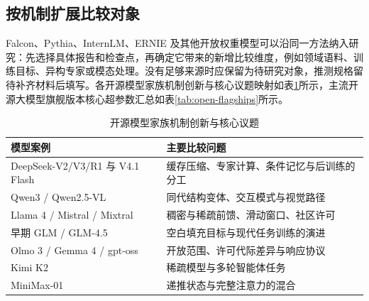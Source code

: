 \documentclass[../textbook.tex]{subfiles}
\begin{document}
\subsection{按机制扩展比较对象}
Falcon、Pythia、InternLM、ERNIE 及其他开放权重模型可以沿同一方法纳入研究：先选择具体报告和检查点，再确定它带来的新增比较维度，例如领域语料、训练目标、异构专家或模态处理。没有足够来源时应保留为待研究对象，推测规格留待补齐材料后填写。各开源模型家族机制创新与核心议题映射如表\ref{tab:open-case-topics}所示，主流开源大模型旗舰版本核心超参数汇总如表\ref{tab:open-flagships}所示。

\begin{table}[htbp]
\centering
\caption{开源模型家族机制创新与核心议题}\label{tab:open-case-topics}
\begin{tabularx}{\linewidth}{p{27mm}X}
\toprule 模型案例 & 主要比较问题\\\midrule
DeepSeek-V2/V3/R1 与 V4.1 Flash & 缓存压缩、专家计算、条件记忆与后训练的分工\\
Qwen3 / Qwen2.5-VL & 同代结构变体、交互模式与视觉路径\\
Llama 4 / Mistral / Mixtral & 稠密与稀疏前馈、滑动窗口、社区许可\\
早期 GLM / GLM-4.5 & 空白填充目标与现代任务训练的演进\\
Olmo 3 / Gemma 4 / gpt-oss & 开放范围、许可代际差异与响应协议\\
Kimi K2 & 稀疏模型与多轮智能体任务\\
MiniMax-01 & 递推状态与完整注意力的混合\\
\bottomrule
\end{tabularx}
\end{table}
\end{document}
